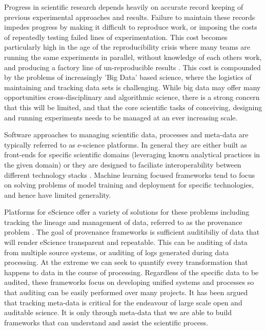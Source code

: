 \documentclass[sigconf]{acmart}
\begin{document}
Progress in scientific research depends heavily on accurate record keeping of previous
experimental approaches and results. Failure to maintain these records impedes progress
by making it difficult to reproduce work, or imposing the costs of repeatedly testing 
failed lines of experimentation. This cost becomes particularly high in the age of the
reproducibility crisis where many teams are running the same experiments in parallel, without
knowledge of each others work, and producing a factory line of un-reproducible results 
\cite{Ioannidis2005}. This cost is compounded by the problems of increasingly 'Big Data' 
based science, where the logistics of maintaining and tracking data sets is challenging.
While big data may offer many opportunities cross-disciplinary and algorithmic science\cite{Schmitt2015}, 
there is a strong concern that this will be limited\cite{Succi2019}, 
and that the core scientific tasks of conceiving,
designing and running experiments needs to be managed at an ever increasing scale.

Software approaches to managing scientific data, processes and meta-data are typically referred to 
as e-science platforms. In general they are either built as front-ends for specific 
scientific domains \cite{Howe2008,Pettit:2010} (leveraging known analytical practices in
the given domain) or they are designed to faciliate interoperability between different
technology stacks \cite{Subramanian2013}. Machine learning focused frameworks tend to 
focus on solving problems of model training and deployment for specific technologies\cite{Alberti:2018,MolnerDomenech:2020}, and hence have limited generality.

Platforms for eScience offer a variety of solutions for these problems including  
tracking the lineage and management of data, referred to as 
the provenance problem \cite{Sahoo:2008,Conquest:2021}.
The goal of provenance frameworks is sufficient auditibiliy of data that will 
render eScience transparent and repeatable. This can be auditing of data from multiple 
source systems, or auditing of logs generated during data processing\cite{Ferdous2020}. 
At the extreme we can seek to quantify every transformation that happens to data in 
the course of processing\cite{Sahoo2009}. Regardless of the
specific data to be audited, these frameworks focus on developing unified systems and 
processes so that auditing can be easily performed over many projects. It has been 
argued that tracking meta-data is critical for the endeavour of large scale open and auditable 
science\cite{Reznik2022}. It is only through meta-data that we are able to build frameworks
that can understand and assist the scientific process.
\end{document}
